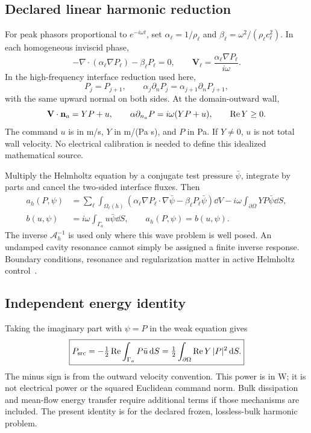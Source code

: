 \subsection{Declared linear harmonic reduction}
For peak phasors proportional to $e^{-i\omega t}$, set
$\alpha_\ell=1/\rho_\ell$ and $\beta_\ell=\omega^2/(\rho_\ell c_\ell^2)$.
In each homogeneous inviscid phase,
\begin{equation}\label{eq:helmholtz}
 -\nabla\cdot(\alpha_\ell\nabla P_\ell)-\beta_\ell P_\ell=0,
 \qquad \mathbf V_\ell=\frac{\alpha_\ell\nabla P_\ell}{i\omega}.
\end{equation}
In the high-frequency interface reduction used here,
\begin{equation}\label{eq:transmission}
 P_j=P_{j+1},\qquad
 \alpha_j\partial_nP_j=\alpha_{j+1}\partial_nP_{j+1},
\end{equation}
with the same upward normal on both sides. At the domain-outward wall,
\begin{equation}\label{eq:robin}
 \mathbf V\cdot\mathbf n_a=YP+u,\qquad
 \alpha\partial_{n_a}P=i\omega(YP+u),\qquad \operatorname{Re} Y\ge0.
\end{equation}
The command $u$ is in m/s, $Y$ in m/(Pa s), and $P$ in Pa.
If $Y\ne0$, $u$ is not total wall velocity. No electrical calibration is
needed to define this idealized mathematical source.

Multiply the Helmholtz equation by a conjugate test pressure $\bar\psi$,
integrate by parts and cancel the two-sided interface fluxes. Then
\begin{align}
 a_h(P,\psi)&=\sum_\ell\int_{\Omega_\ell(h)}
 (\alpha_\ell\nabla P_\ell\cdot\nabla\bar\psi-\beta_\ell P_\ell\bar\psi)\dd V
 -i\omega\int_{\partial\Omega}YP\bar\psi\dd S,\label{eq:weak-a}\\
 b(u,\psi)&=i\omega\int_{\Gamma_a}u\bar\psi\dd S,\qquad
 a_h(P,\psi)=b(u,\psi).\label{eq:weak-b}
\end{align}
The inverse $\mathcal A_h^{-1}$ is used only where this wave problem is
well posed. An undamped cavity resonance cannot simply be assigned a finite
inverse response. Boundary conditions, resonance and regularization matter
in active Helmholtz control~\cite{hubenthal2016}.

\subsection{Independent energy identity}
Taking the imaginary part with $\psi=P$ in the weak equation gives
\begin{equation}\label{eq:power}
 \boxed{P_{\rm src}=-\tfrac12\operatorname{Re}\int_{\Gamma_a}P\bar u\,\mathrm d S
 =\tfrac12\int_{\partial\Omega}\operatorname{Re} Y\,|P|^2\,\mathrm d S.}
\end{equation}
The minus sign is from the outward velocity convention. This power is in W;
it is not electrical power or the squared Euclidean command norm. Bulk
dissipation and mean-flow energy transfer require additional terms if those
mechanisms are included. The present identity is for the declared frozen,
lossless-bulk harmonic problem.

